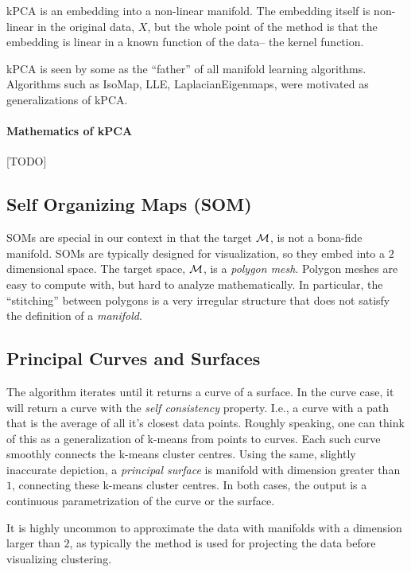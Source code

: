 \documentclass[12pt,a4paper]{article}
\begin{document}
kPCA is an embedding into a non-linear manifold.
The embedding itself is non-linear in the original data, $X$, but the whole point of the method is that the embedding is linear in a known function of the data-- the kernel function.


\begin{remark}
	kPCA is seen by some as the ``father'' of all manifold learning algorithms. 
	Algorithms such as IsoMap, LLE, LaplacianEigenmaps, were motivated as generalizations of kPCA.
\end{remark}



\paragraph{Mathematics of kPCA}
[TODO]




\subsection{Self Organizing Maps (SOM)}
SOMs are special in our context in that the target $\mathcal{M}$, is not a bona-fide manifold. 
SOMs are typically designed for visualization, so they embed into a $2$ dimensional space. 
The target space, $\mathcal{M}$, is a \emph{polygon mesh}.
Polygon meshes are easy to compute with, but hard to analyze mathematically. 
In particular, the ``stitching'' between polygons is a very irregular structure that does not satisfy the definition of a \emph{manifold}.



\subsection{Principal Curves and Surfaces}
The algorithm iterates until it returns a curve of a surface.
In the curve case, it will return a curve with the \emph{self consistency} property. 
I.e., a curve with a path that is the average of all it's closest data points.
Roughly speaking, one can think of this as a generalization of k-means from points to curves. 
Each such curve smoothly connects the k-means cluster centres.
Using the same, slightly inaccurate depiction, a \emph{principal surface} is manifold with dimension greater than $1$, connecting these k-means cluster centres.
In both cases, the output is a continuous parametrization of the curve or the surface.

It is highly uncommon to approximate the data with manifolds with a dimension larger than $2$, as typically the method is used for projecting the data before visualizing \andor clustering.
\end{document}

